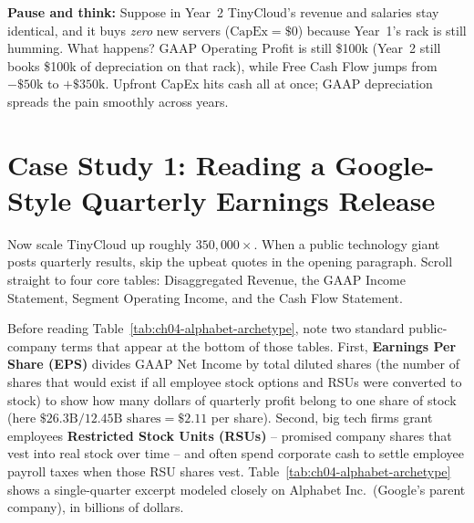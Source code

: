 \begin{recoverybox}
\textbf{Pause and think:} Suppose in Year~2 TinyCloud's revenue and salaries stay identical, and it buys \emph{zero} new servers ($\text{CapEx} = \$0$) because Year~1's rack is still humming. What happens? GAAP Operating Profit is still \$100k (Year~2 still books \$100k of depreciation on that rack), while Free Cash Flow jumps from $-\$50\text{k}$ to $+\$350\text{k}$. Upfront CapEx hits cash all at once; GAAP depreciation spreads the pain smoothly across years.
\end{recoverybox}

\section{Case Study 1: Reading a Google-Style Quarterly Earnings Release}

Now scale TinyCloud up roughly $350{,}000\times$. When a public technology giant posts quarterly results, skip the upbeat quotes in the opening paragraph. Scroll straight to four core tables: Disaggregated Revenue, the GAAP Income Statement, Segment Operating Income, and the Cash Flow Statement.

Before reading Table~\ref{tab:ch04-alphabet-archetype}, note two standard public-company terms that appear at the bottom of those tables. First, \textbf{Earnings Per Share (EPS)} divides GAAP Net Income by total diluted shares (the number of shares that would exist if all employee stock options and RSUs were converted to stock) to show how many dollars of quarterly profit belong to one share of stock (here $\$26.3\text{B} / 12.45\text{B shares} = \$2.11$ per share). Second, big tech firms grant employees \textbf{Restricted Stock Units (RSUs)} -- promised company shares that vest into real stock over time -- and often spend corporate cash to settle employee payroll taxes when those RSU shares vest. Table~\ref{tab:ch04-alphabet-archetype} shows a single-quarter excerpt modeled closely on Alphabet Inc.\ (Google's parent company), in billions of dollars.

